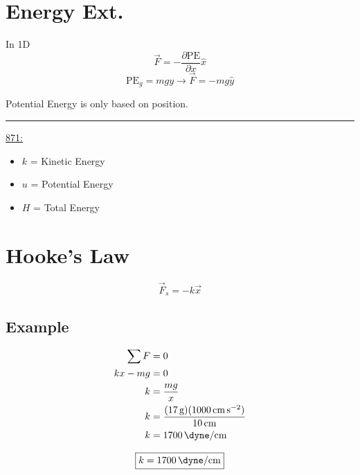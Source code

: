 \documentclass{article}
\begin{document}
\newcommand{\hr}{\par\noindent\rule{\textwidth}{0.4pt}}

\newcommand{\bc}[1]{
	\begin{equation*}
		\begin{boxed}
			{#1}
		\end{boxed}
	\end{equation*}
}

\newcommand{\cond}[2]{
	\ifmmode
		{#1} \quad {#2}
	\else
		$$ {#1} \quad {#2} $$
	\fi
}

\tableofcontents

\section{Energy Ext.}

In 1D
\begin{equation}
	\vec{F} = - \frac{\partial \text{PE}}{\partial x} \hat{x}
\end{equation}
\begin{equation}
	\text{PE}_g = mgy \rightarrow \vec{F} = -mg \hat{y}
\end{equation}

Potential Energy is only based on position.

\hr

\underline{871:}
\begin{itemize}
	\item $ k $ = Kinetic Energy
	\item $ u $ = Potential Energy
	\item $ H $ = Total Energy
\end{itemize}

\section{Hooke's Law}

\begin{equation}
	\vec{F}_s = -k\vec{x}
\end{equation}

\subsection{Example}

\begin{align*}
	\sum F & = 0 \\
	kx - mg & = 0 \\
	k & = \frac{mg}{x} \\
	k & = \frac{(\SI{17}{\gram})(\SI{1000}{\centi \meter \per \second \squared})}{\SI{10}{\centi \meter}} \\
	k & = \SI{1700}{\dyne \per \centi \meter}
\end{align*}
\bc{k = \SI{1700}{\dyne \per \centi \meter}}
\end{document}
